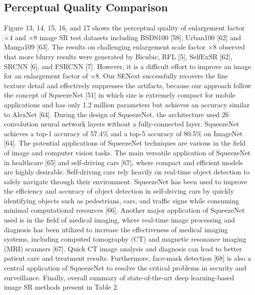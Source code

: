 \documentclass{ieeeaccess}
\begin{document}
\subsection{Perceptual Quality Comparison}
Figure 13, 14, 15, 16, and 17 shows the perceptual quality of enlargement factor $\times 4$ and $\times 8$ image SR test datasets including BSDS100 [58], Urban100 [62] and Manga109 [63]. The results on challenging enlargement scale factor $\times 8$ observed that more blurry results were generated by Bicubic, RFL [5], SelfExSR [62], SRCNN [6], and FSRCNN [7]. However, it is a difficult effort to improve an image for an enlargement factor of $\times 8$. Our SENext successfully recovers the fine texture detail and effectively suppresses the artifacts, because our approach follow the concept of SqueezeNet [51] in which size is extremely compact for mobile applications and has only 1.2 million parameters but achieves an accuracy similar to AlexNet [64]. During the design of SqueezeNet, the architecture used 26 convolution neural network layers without a fully-connected layer. SqueezeNet achieves a top-1 accuracy of 57.4\% and a top-5 accuracy of 80.5\% on ImageNet [64]. The potential applications of SqueezeNet   techniques are various in the field of image and computer vision tasks. The main versatile application of SqueezeNet in healthcare [65] and self-driving cars [67], where compact and efficient models are highly desirable. Self-driving cars rely heavily on real-time object detection to safely navigate through their environment. SqueezeNet has been used to improve the efficiency and accuracy of object detection in self-driving cars by quickly identifying objects such as pedestrians, cars, and traffic signs while consuming minimal computational resources [66]. Another major application of SqueezeNet used is in the field of medical imaging, where real-time image processing and diagnosis has been utilized to increase the effectiveness of medical imaging systems, including computed tomography (CT) and magnetic resonance imaging (MRI) scanners [67]. Quick CT image analysis and diagnosis can lead to better patient care and treatment results. Furthermore, face-mask detection [68] is also a central application of SqueezeNet to resolve the critical problems in security and surveillance. Finally, overall summary of state-of-the-art deep learning-based image SR methods present in Table 2.
\end{document}

